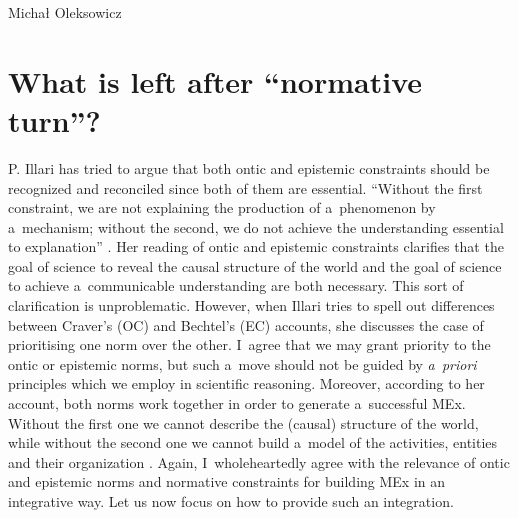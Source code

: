 \begin{artengenv}{Michał Oleksowicz}
\section{What is left after ``normative turn''?}
P. Illari
\parencite*[][pp.248–252]{illari_mechanistic_2013} %
 has tried to argue that both ontic and epistemic constraints should be recognized and reconciled since both of them are essential. ``Without the first constraint, we are not explaining the production of a~phenomenon by a~mechanism; without the second, we do not achieve the understanding essential to explanation'' 
\parencite[][p.250]{illari_mechanistic_2013}. %
 Her reading of ontic and epistemic constraints clarifies that the goal of science to reveal the causal structure of the world and the goal of science to achieve a~communicable understanding are both necessary. This sort of clarification is unproblematic. However, when Illari tries to spell out differences between Craver's (OC) and Bechtel's (EC) accounts, she discusses the case of prioritising one norm over the other. I~agree that we may grant priority to the ontic or epistemic norms, but such a~move should not be guided by \textit{a~priori} principles which we employ in scientific reasoning. Moreover, according to her account, both norms work together in order to generate a~successful MEx. Without the first one we cannot describe the (causal) structure of the world, while without the second one we cannot build a~model of the activities, entities and their organization 
\parencite[][p.250]{illari_mechanistic_2013}. %
 Again, I~wholeheartedly agree with the relevance of ontic and epistemic norms and normative constraints for building MEx in an integrative way. Let us now focus on how to provide such an integration.


\end{artengenv}
